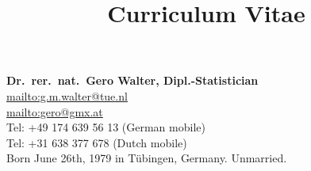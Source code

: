 \documentclass[a4paper]{simplecv}
\begin{document}
\pagestyle{myheadings}




\title{Curriculum Vitae}

\nocite{2017:walter-aslett-coolen}
\nocite{ipmu2016}
\nocite{2016:coolenetal}
\nocite{2015:walter-graham-coolen}
\nocite{itip-statinf,Troffaes2014a,diss,Walter2012b,Troffaes2012a,Walter2011a,Walter2010a,%
Walter2009b,Walter2009a,Walter2007c,Walter2007b,Walter2007a,Walter2006a}

\vspace*{-10ex}
\maketitle

\textbf{\large Dr.\ rer.\ nat.\ Gero Walter, Dipl.-Statistician}\\[2ex]
\url{mailto:g.m.walter@tue.nl}\\
\url{mailto:gero@gmx.at}\\
Tel: +49 174 639 56 13 (German mobile)\\
Tel: +31 638 377 678 (Dutch mobile)\\

Born June 26th, 1979 in T\"{u}bingen, Germany. Unmarried.

\end{document}
